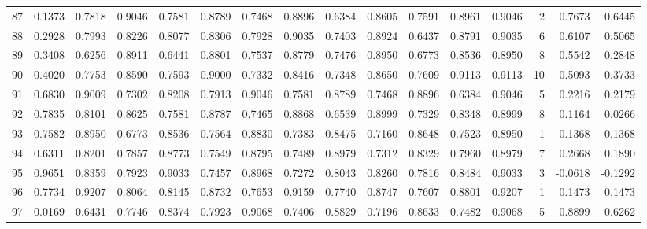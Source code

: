 \begin{tabular}{lrrrrrrrrrrrrrrr}
87  &      0.1373 &  0.7818 &  0.9046 &  0.7581 &  0.8789 &  0.7468 &  0.8896 &  0.6384 &  0.8605 &  0.7591 &   0.8961 &     0.9046 &      2 &                    0.7673 &                     0.6445 \\
88  &      0.2928 &  0.7993 &  0.8226 &  0.8077 &  0.8306 &  0.7928 &  0.9035 &  0.7403 &  0.8924 &  0.6437 &   0.8791 &     0.9035 &      6 &                    0.6107 &                     0.5065 \\
89  &      0.3408 &  0.6256 &  0.8911 &  0.6441 &  0.8801 &  0.7537 &  0.8779 &  0.7476 &  0.8950 &  0.6773 &   0.8536 &     0.8950 &      8 &                    0.5542 &                     0.2848 \\
90  &      0.4020 &  0.7753 &  0.8590 &  0.7593 &  0.9000 &  0.7332 &  0.8416 &  0.7348 &  0.8650 &  0.7609 &   0.9113 &     0.9113 &     10 &                    0.5093 &                     0.3733 \\
91  &      0.6830 &  0.9009 &  0.7302 &  0.8208 &  0.7913 &  0.9046 &  0.7581 &  0.8789 &  0.7468 &  0.8896 &   0.6384 &     0.9046 &      5 &                    0.2216 &                     0.2179 \\
92  &      0.7835 &  0.8101 &  0.8625 &  0.7581 &  0.8787 &  0.7465 &  0.8868 &  0.6539 &  0.8999 &  0.7329 &   0.8348 &     0.8999 &      8 &                    0.1164 &                     0.0266 \\
93  &      0.7582 &  0.8950 &  0.6773 &  0.8536 &  0.7564 &  0.8830 &  0.7383 &  0.8475 &  0.7160 &  0.8648 &   0.7523 &     0.8950 &      1 &                    0.1368 &                     0.1368 \\
94  &      0.6311 &  0.8201 &  0.7857 &  0.8773 &  0.7549 &  0.8795 &  0.7489 &  0.8979 &  0.7312 &  0.8329 &   0.7960 &     0.8979 &      7 &                    0.2668 &                     0.1890 \\
95  &      0.9651 &  0.8359 &  0.7923 &  0.9033 &  0.7457 &  0.8968 &  0.7272 &  0.8043 &  0.8260 &  0.7816 &   0.8484 &     0.9033 &      3 &                   -0.0618 &                    -0.1292 \\
96  &      0.7734 &  0.9207 &  0.8064 &  0.8145 &  0.8732 &  0.7653 &  0.9159 &  0.7740 &  0.8747 &  0.7607 &   0.8801 &     0.9207 &      1 &                    0.1473 &                     0.1473 \\
97  &      0.0169 &  0.6431 &  0.7746 &  0.8374 &  0.7923 &  0.9068 &  0.7406 &  0.8829 &  0.7196 &  0.8633 &   0.7482 &     0.9068 &      5 &                    0.8899 &                     0.6262 \\

\end{tabular}
